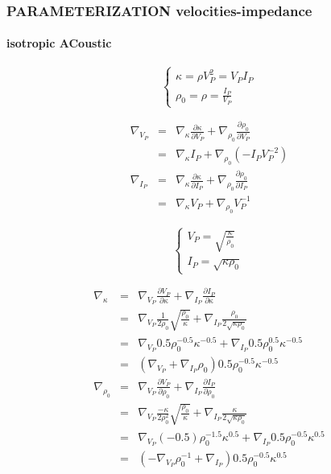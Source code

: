 \documentclass[9pt]{beamer}
\newcommand{\partderi}[2]{\frac{\partial#1}{\partial#2}}
\begin{document}
\begin{frame}\frametitle{PARAMETERIZATION velocities-impedance}
\framesubtitle{isotropic ACoustic}

  \begin{center}
  \end{center}
  
  \begin{minipage}{0.45\linewidth}
    \[\left\{ \begin{array}{l}
      \kappa = \rho V_P^2 = V_PI_P \\
      \rho_0 = \rho = \frac{I_P}{V_P}
    \end{array} \right.\]
    
    \begin{eqnarray}
      \nabla_{V_P} &=& \nabla_{\kappa} \partderi{\kappa}{V_P} + \nabla_{\rho_0} \partderi{\rho_0}{V_P} \nonumber\\
                   &=& \nabla_{\kappa} I_P + \nabla_{\rho_0} (-I_PV_P^{-2}) \nonumber\\
      \nabla_{I_P} &=& \nabla_{\kappa} \partderi{\kappa}{I_P} + \nabla_{\rho_0} \partderi{\rho_0}{I_P} \nonumber\\
		   &=& \nabla_{\kappa} V_P + \nabla_{\rho_0} V_P^{-1} \nonumber
    \end{eqnarray}

  \end{minipage} \vline
  \begin{minipage}{0.45\linewidth}
    \[\left\{ \begin{array}{l}
      V_P  = \sqrt{\frac{\kappa}{\rho_0}} \\
      I_P = \sqrt{\kappa\rho_0}
    \end{array} \right.\]
    
    \begin{eqnarray}
      \nabla_{\kappa} &=& \nabla_{V_P} \partderi{V_P}{\kappa} + \nabla_{I_P} \partderi{I_P}{\kappa} \nonumber\\
                      &=& \nabla_{V_P} \frac{1}{2\rho_0}\sqrt{\frac{\rho_0}{\kappa}} + \nabla_{I_P} \frac{\rho_0}{2\sqrt{\kappa\rho_0}} \nonumber\\
                      &=& \nabla_{V_P} 0.5\rho_0^{-0.5}\kappa^{-0.5} + \nabla_{I_P} 0.5\rho_0^{0.5}\kappa^{-0.5} \nonumber\\
                      &=& \left( \nabla_{V_P} + \nabla_{I_P} \rho_0 \right) 0.5\rho_0^{-0.5}\kappa^{-0.5} \nonumber\\
      \nabla_{\rho_0} &=& \nabla_{V_P} \partderi{V_P}{\rho_0} + \nabla_{I_P} \partderi{I_P}{\rho_0} \nonumber\\
                      &=& \nabla_{V_P} \frac{-\kappa}{2\rho_0^2}\sqrt{\frac{\rho_0}{\kappa}} + \nabla_{I_P} \frac{\kappa}{2\sqrt{\kappa\rho_0}} \nonumber\\
                      &=& \nabla_{V_P} (-0.5)\rho_0^{-1.5}\kappa^{0.5} + \nabla_{I_P} 0.5\rho_0^{-0.5}\kappa^{0.5} \nonumber\\
                      &=& \left(-\nabla_{V_P}\rho_0^{-1} + \nabla_{I_P} \right) 0.5\rho_0^{-0.5}\kappa^{0.5} \nonumber
    \end{eqnarray}
  \end{minipage}


\end{frame}
\end{document}
